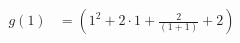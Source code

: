 

	\begin{align*}
		g\left(1\right)&= \left(1^2+2\cdot 1+\frac{2}{\left(1+1\right)}+2\right)\\
	\end{align*}

